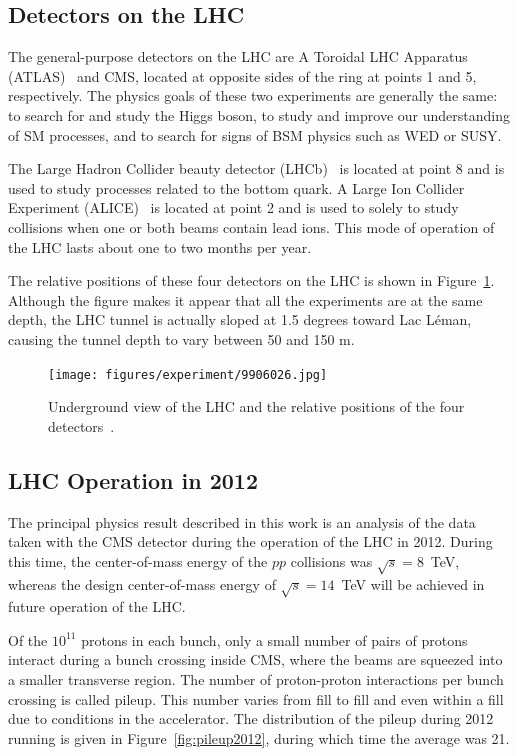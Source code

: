 \subsection{Detectors on the LHC\label{subsec:detectors}}

The general-purpose detectors on the LHC are A Toroidal LHC Apparatus (ATLAS)~\cite{cern-jinst-atlas}
and CMS, located at opposite sides of the ring at points 1 and 5, respectively. The physics
goals of these two experiments are generally the same: to search for and study the Higgs boson,
to study and improve our understanding of SM processes, and to search for signs of BSM physics such as
WED or SUSY.

The Large Hadron Collider beauty detector (LHCb)~\cite{cern-jinst-lhcb}
is located at point 8 and is used
to study processes related to the bottom quark. A Large Ion Collider Experiment
(ALICE)~\cite{cern-jinst-alice} is located
at point 2 and is used to solely to study collisions when one or both beams contain lead ions. This
mode of operation of the LHC lasts about one to two months per year.

The relative positions of these four detectors on the LHC is shown in Figure~\ref{fig:lhc_detectors}.
Although the figure makes it appear that all the experiments are at the same depth, the LHC tunnel is
actually sloped at 1.5 degrees toward Lac L\'{e}man,
causing the tunnel depth to vary between 50 and 150 m.

\begin{figure}[ht]
 \begin{center}
    \texttt{[image: figures/experiment/9906026.jpg]}
      \end{center}
\caption{Underground view of the LHC and the relative positions of the four detectors~\cite{Dailler:842399}.}
\label{fig:lhc_detectors}
\end{figure}

\subsection{LHC Operation in 2012}

The principal physics result described in this work is an analysis of the data taken with the
CMS detector during the operation of the LHC in 2012. During this time, the center-of-mass energy
of the $pp$ collisions was $\sqrt{s} = 8$~TeV, whereas the design center-of-mass energy of
$\sqrt{s} = 14$~TeV will be achieved in future operation of the LHC. 

Of the $10^{11}$ protons in each bunch, only a small number of pairs of protons interact during
a bunch crossing inside CMS, where the beams are squeezed into a smaller transverse region. The number
of proton-proton interactions per bunch crossing is called pileup. This number
varies from fill to fill and even within a fill due to conditions in the accelerator. The distribution
of the pileup during 2012 running is given in Figure~\ref{fig:pileup2012}, during which time the
average was 21.

